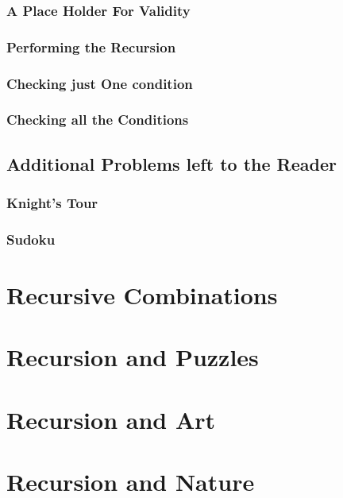\subsubsection{A Place Holder For Validity}

\subsubsection{Performing the Recursion}

\subsubsection{Checking just One condition}


\subsubsection{Checking all the Conditions}




\subsection{Additional Problems left to the Reader}

\subsubsection{Knight's Tour}

\subsubsection{Sudoku}




\section{Recursive Combinations}



\section{Recursion and Puzzles}



\section{Recursion and Art}

\section{Recursion and Nature}
